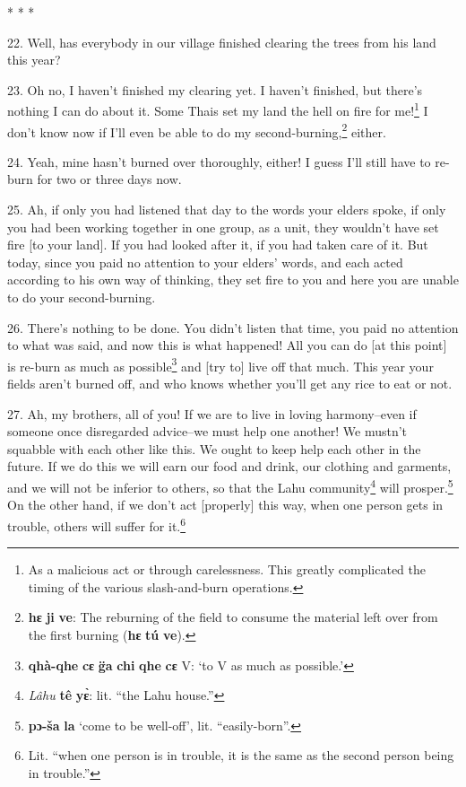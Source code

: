 \begin{center}
* * *
\end{center}

22. Well, has everybody in our village finished clearing the trees from his land
this year?

23. Oh no, I haven't finished my clearing yet. I haven't finished, but there's
nothing I can do about it. Some Thais set my land the hell on fire for me!\footnote{As a malicious act or through carelessness. This greatly complicated the timing of the various slash-and-burn operations.}
I don't know now if I'll even be able to do my second-burning,\footnote{\textbf{hɛ} \textbf{ji} \textbf{ve}: The reburning of the field to consume the material left over from the first burning (\textbf{hɛ} \textbf{tú} \textbf{ve}).} either.

24. Yeah, mine hasn't burned over thoroughly, either! I guess I'll still have to
re-burn for two or three days now.

25. Ah, if only you had listened that day to the words your elders spoke, if only
you had been working together in one group, as a unit, they wouldn't have set fire
[to your land]. If you had looked after it, if you had taken care of it. But today,
since you paid no attention to your elders' words, and each acted according to
his own way of thinking, they set fire to you and here you are unable to do your
second-burning.

26. There's nothing to be done. You didn't listen that time, you paid no attention
to what was said, and now this is what happened! All you can do [at this point]
is re-burn as much as possible\footnote{\textbf{qhà-qhe} \textbf{cɛ} \textbf{g̈a} \textbf{chi} \textbf{qhe} \textbf{cɛ} V: `to V as much as possible.'} and [try to] live off that much. This year your
fields aren't burned off, and who knows whether you'll get any rice to eat or not.

27. Ah, my brothers, all of you! If we are to live in loving harmony--even if
someone once disregarded advice--we must help one another! We mustn't squabble
with each other like this. We ought to keep help each other in the future. If we
do this we will earn our food and drink, our clothing and garments, and we will
not be inferior to others, so that the Lahu community\footnote{\textit{ Lâh}\textit{\emph{u}} \textbf{tê} \textbf{yɛ̀}: lit. ``the Lahu house.''} will prosper.\footnote{\textbf{pɔ-ša} \textbf{la} `come to be well-off', lit. ``easily-born''.} On
the other hand, if we don't act [properly] this way, when one person gets in trouble,
others will suffer for it.\footnote{Lit. ``when one person is in trouble, it is the same as the second person being in trouble.''}


